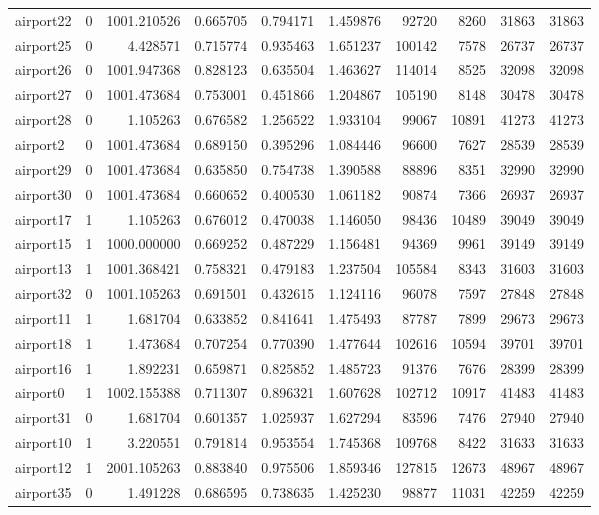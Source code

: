 \begin{longtable}{|l|r|r|r|r|r|r|r|r|r|}
airport22 & 0 & 1001.210526 & 0.665705 & 0.794171 & 1.459876 & 92720 & 8260 & 31863 & 31863 \\
airport25 & 0 & 4.428571 & 0.715774 & 0.935463 & 1.651237 & 100142 & 7578 & 26737 & 26737 \\
airport26 & 0 & 1001.947368 & 0.828123 & 0.635504 & 1.463627 & 114014 & 8525 & 32098 & 32098 \\
airport27 & 0 & 1001.473684 & 0.753001 & 0.451866 & 1.204867 & 105190 & 8148 & 30478 & 30478 \\
airport28 & 0 & 1.105263 & 0.676582 & 1.256522 & 1.933104 & 99067 & 10891 & 41273 & 41273 \\
airport2 & 0 & 1001.473684 & 0.689150 & 0.395296 & 1.084446 & 96600 & 7627 & 28539 & 28539 \\
airport29 & 0 & 1001.473684 & 0.635850 & 0.754738 & 1.390588 & 88896 & 8351 & 32990 & 32990 \\
airport30 & 0 & 1001.473684 & 0.660652 & 0.400530 & 1.061182 & 90874 & 7366 & 26937 & 26937 \\
airport17 & 1 & 1.105263 & 0.676012 & 0.470038 & 1.146050 & 98436 & 10489 & 39049 & 39049 \\
airport15 & 1 & 1000.000000 & 0.669252 & 0.487229 & 1.156481 & 94369 & 9961 & 39149 & 39149 \\
airport13 & 1 & 1001.368421 & 0.758321 & 0.479183 & 1.237504 & 105584 & 8343 & 31603 & 31603 \\
airport32 & 0 & 1001.105263 & 0.691501 & 0.432615 & 1.124116 & 96078 & 7597 & 27848 & 27848 \\
airport11 & 1 & 1.681704 & 0.633852 & 0.841641 & 1.475493 & 87787 & 7899 & 29673 & 29673 \\
airport18 & 1 & 1.473684 & 0.707254 & 0.770390 & 1.477644 & 102616 & 10594 & 39701 & 39701 \\
airport16 & 1 & 1.892231 & 0.659871 & 0.825852 & 1.485723 & 91376 & 7676 & 28399 & 28399 \\
airport0 & 1 & 1002.155388 & 0.711307 & 0.896321 & 1.607628 & 102712 & 10917 & 41483 & 41483 \\
airport31 & 0 & 1.681704 & 0.601357 & 1.025937 & 1.627294 & 83596 & 7476 & 27940 & 27940 \\
airport10 & 1 & 3.220551 & 0.791814 & 0.953554 & 1.745368 & 109768 & 8422 & 31633 & 31633 \\
airport12 & 1 & 2001.105263 & 0.883840 & 0.975506 & 1.859346 & 127815 & 12673 & 48967 & 48967 \\
airport35 & 0 & 1.491228 & 0.686595 & 0.738635 & 1.425230 & 98877 & 11031 & 42259 & 42259 \\

\end{longtable}
